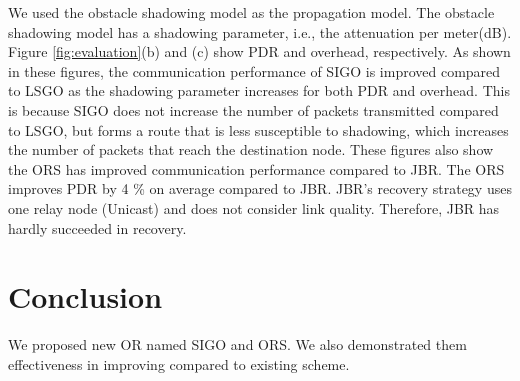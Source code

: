 \documentclass{comex}
\begin{document}
We used the obstacle shadowing model\cite{obstacle} as the propagation model. The obstacle shadowing model has a shadowing parameter, i.e., the attenuation per meter(dB). 
Figure \ref{fig:evaluation}(b) and (c) show PDR and overhead, respectively.  As shown in these figures, the communication performance of SIGO is improved compared to LSGO as the shadowing parameter increases for both PDR and overhead. This is because SIGO does not increase the number of packets transmitted compared to LSGO, but forms a route that is less susceptible to shadowing, which increases the number of packets that reach the destination node. These figures also show the ORS has improved communication performance compared to JBR. The ORS improves PDR by 4 \% on average compared to JBR. JBR’s recovery strategy uses one relay node (Unicast) and does not consider link quality. Therefore, JBR has hardly succeeded in recovery. 

 


\section{Conclusion}
We proposed new OR named SIGO and ORS. We also demonstrated them effectiveness in improving compared to existing scheme.




\end{document}
